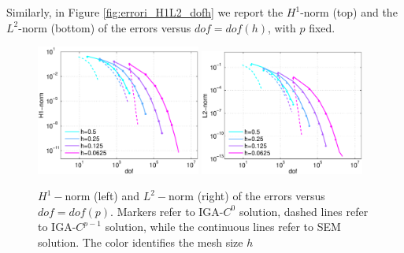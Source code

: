 \documentclass[11pt]{article}
\begin{document}
Similarly, in Figure \ref{fig:errori_H1L2_dofh} we report the $H^1$-norm (top) 
and the $L^2$-norm (bottom) of the errors
versus $dof=dof(h)$, with $p$ fixed.


\begin{figure}
\includegraphics[width=0.48\textwidth]{Images/errdofH1_3d_p.eps}
\includegraphics[width=0.48\textwidth]{Images/errdofL2_3d_p.eps}\\
\caption{$H^1-$norm   (left) and $L^2-$norm (right) of the errors versus 
$dof=dof(p)$.
Markers refer to IGA-$C^0$ solution, dashed lines refer to IGA-$C^{p-1}$
solution, while the continuous lines refer to SEM solution. 
The color identifies the
mesh size $h$}
\label{fig:errori_H1L2_dofp}
\end{figure}
\end{document}
